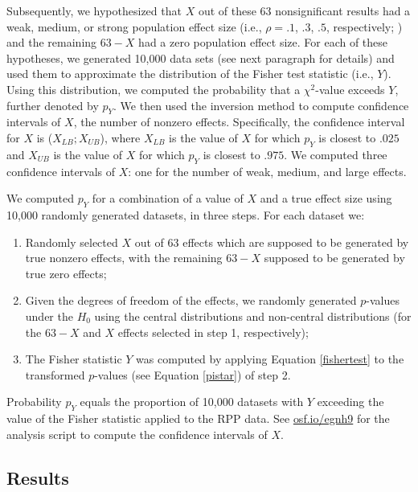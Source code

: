 \documentclass{article}
\begin{document}
Subsequently, we hypothesized that $X$ out of these 63 nonsignificant results had a weak, medium, or strong population effect size (i.e., $\rho=.1$, $.3$, $.5$, respectively; \cite{Cohen1988-wg}) and the remaining $63-X$ had a zero population effect size. For each of these hypotheses, we generated 10,000 data sets (see next paragraph for details) and used them to approximate the distribution of the Fisher test statistic (i.e., $Y$). Using this distribution, we computed the probability that a $\chi^2$-value exceeds $Y$, further denoted by $p_Y$. We then used the inversion method \cite{Casella2002-cy} to compute confidence intervals of $X$, the number of nonzero effects. Specifically, the confidence interval for $X$ is ($X_{LB};X_{UB}$), where $X_{LB}$ is the value of $X$ for which $p_Y$ is closest to $.025$ and $X_{UB}$ is the value of $X$ for which $p_Y$ is closest to $.975$. We computed three confidence intervals of $X$: one for the number of weak, medium, and large effects.

We computed $p_Y$ for a combination of a value of $X$ and a true effect size using 10,000 randomly generated datasets, in three steps. For each dataset we: 
\begin{enumerate}
\item Randomly selected $X$ out of 63 effects which are supposed to be generated by true nonzero effects, with the remaining $63-X$ supposed to be generated by true zero effects;
\item Given the degrees of freedom of the effects, we randomly generated $p$-values under the $H_0$ using the central distributions and non-central distributions (for the $63-X$ and $X$ effects selected in step 1, respectively);
\item The Fisher statistic $Y$ was computed by applying Equation \ref{fishertest} to the transformed $p$-values (see Equation \ref{pistar}) of step 2. 
\end{enumerate}
Probability $p_Y$ equals the proportion of 10,000 datasets with $Y$ exceeding the value of the Fisher statistic applied to the RPP data. See \url{osf.io/egnh9} for the analysis script to compute the confidence intervals of $X$. 

\subsection*{Results}
\end{document}
